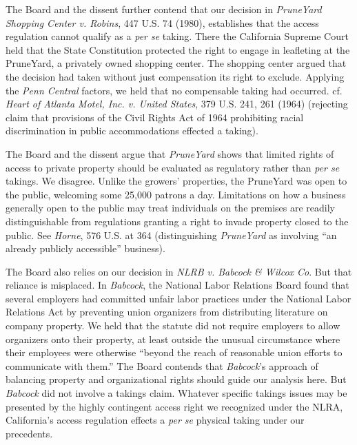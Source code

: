 The Board and the dissent further contend that our decision in \textit{PruneYard
Shopping Center v. Robins}, 447 U.S. 74 (1980), establishes that the access
regulation cannot qualify as a \textit{per se} taking. There the California
Supreme Court held that the State Constitution protected the right to engage in
leafleting at the PruneYard, a privately owned shopping center. The shopping
center argued that the decision had taken without just compensation its right to
exclude. Applying the \textit{Penn Central} factors, we held that no compensable
taking had occurred. cf. \textit{Heart of Atlanta Motel, Inc. v. United States},
379 U.S. 241, 261 (1964) (rejecting claim that provisions of the Civil Rights
Act of 1964 prohibiting racial discrimination in public accommodations effected
a taking).


The Board and the dissent argue that \textit{PruneYard} shows that limited
rights of access to private property should be evaluated as regulatory rather
than \textit{per se} takings. We disagree. Unlike the growers' properties, the
PruneYard was open to the public, welcoming some 25,000 patrons a day.
Limitations on how a business generally open to the public may treat individuals
on the premises are readily distinguishable from regulations granting a right to
invade property closed to the public. See \textit{Horne}, 576 U.S. at 364
(distinguishing \textit{PruneYard} as involving ``an already publicly
accessible'' business).


The Board also relies on our decision in \textit{NLRB v. Babcock \& Wilcox Co}.
But that reliance is misplaced. In \textit{Babcock}, the National Labor
Relations Board found that several employers had committed unfair labor
practices under the National Labor Relations Act by preventing union organizers
from distributing literature on company property. We held that the statute did
not require employers to allow organizers onto their property, at least outside
the unusual circumstance where their employees were otherwise ``beyond the reach
of reasonable union efforts to communicate with them.'' The Board contends that
\textit{Babcock}'s approach of balancing property and organizational rights
should guide our analysis here. But \textit{Babcock} did not involve a takings
claim. Whatever specific takings issues may be presented by the highly
contingent access right we recognized under the NLRA, California's access
regulation effects a \textit{per se} physical taking under our precedents. 



